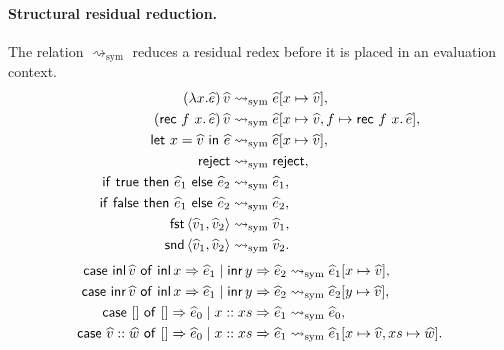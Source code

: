 \paragraph{Structural residual reduction.}
The relation $\rightsquigarrow_{\mathrm{sym}}$ reduces
a residual redex before it is placed in an evaluation context.
\[
\begin{aligned}
(\lambda x.\widehat e)\,\widehat v
  &\rightsquigarrow_{\mathrm{sym}}
    \widehat e[x\mapsto\widehat v],\\
(\mathsf{rec}\ f\ x.\,\widehat e)\,\widehat v
  &\rightsquigarrow_{\mathrm{sym}}
    \widehat e[x\mapsto\widehat v,
               f\mapsto\mathsf{rec}\ f\ x.\,\widehat e],\\
\mathsf{let}\ x=\widehat v\ \mathsf{in}\ \widehat e
  &\rightsquigarrow_{\mathrm{sym}}
    \widehat e[x\mapsto\widehat v],\\
\mathsf{reject}
  &\rightsquigarrow_{\mathrm{sym}}\mathsf{reject},\\
\mathsf{if}\ \mathsf{true}\ \mathsf{then}\ \widehat e_1\ \mathsf{else}\ \widehat e_2
  &\rightsquigarrow_{\mathrm{sym}}\widehat e_1,\\
\mathsf{if}\ \mathsf{false}\ \mathsf{then}\ \widehat e_1\ \mathsf{else}\ \widehat e_2
  &\rightsquigarrow_{\mathrm{sym}}\widehat e_2,\\
\mathsf{fst}\,\langle\widehat v_1,\widehat v_2\rangle
  &\rightsquigarrow_{\mathrm{sym}}\widehat v_1,\\
\mathsf{snd}\,\langle\widehat v_1,\widehat v_2\rangle
  &\rightsquigarrow_{\mathrm{sym}}\widehat v_2.
\end{aligned}
\]
\[
\begin{aligned}
\mathsf{case}\ \mathsf{inl}\,\widehat v\ \mathsf{of}\ \mathsf{inl}\,x\Rightarrow \widehat e_1\mid\mathsf{inr}\,y\Rightarrow \widehat e_2
  &\rightsquigarrow_{\mathrm{sym}}
    \widehat e_1[x\mapsto\widehat v],\\
\mathsf{case}\ \mathsf{inr}\,\widehat v\ \mathsf{of}\ \mathsf{inl}\,x\Rightarrow \widehat e_1\mid\mathsf{inr}\,y\Rightarrow \widehat e_2
  &\rightsquigarrow_{\mathrm{sym}}
    \widehat e_2[y\mapsto\widehat v],\\
\mathsf{case}\ []\ \mathsf{of}\ []\Rightarrow \widehat e_0\mid x::xs\Rightarrow \widehat e_1
  &\rightsquigarrow_{\mathrm{sym}}\widehat e_0,\\
\mathsf{case}\ \widehat v::\widehat w\ \mathsf{of}\ []\Rightarrow \widehat e_0\mid x::xs\Rightarrow \widehat e_1
  &\rightsquigarrow_{\mathrm{sym}}
    \widehat e_1[x\mapsto\widehat v,xs\mapsto\widehat w].
\end{aligned}
\]

